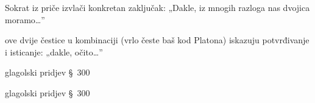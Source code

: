 \begin{description}[noitemsep]
\item[πολλῶν δὴ οὖν ἕνεκα] Sokrat iz priče izvlači konkretan zaključak: „Dakle, iz mnogih razloga nas dvojica moramo\dots”
\item[δὴ οὖν] ove dvije čestice u kombinaciji (vrlo česte baš kod Platona) iskazuju potvrđivanje i isticanje: „dakle, očito\dots”
\item[λεκτέον] glagolski pridjev §~300
\item[καθευδητέον] glagolski pridjev §~300
\end{description}

